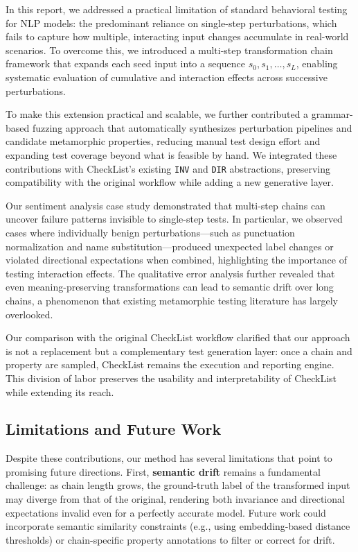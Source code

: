 \documentclass[11pt]{article}
\begin{document}
In this report, we addressed a practical limitation of standard behavioral testing for NLP models: the predominant reliance on single-step perturbations, which fails to capture how multiple, interacting input changes accumulate in real-world scenarios. To overcome this, we introduced a multi-step transformation chain framework that expands each seed input into a sequence $s_0, s_1, \dots, s_L$, enabling systematic evaluation of cumulative and interaction effects across successive perturbations.

To make this extension practical and scalable, we further contributed a grammar-based fuzzing approach that automatically synthesizes perturbation pipelines and candidate metamorphic properties, reducing manual test design effort and expanding test coverage beyond what is feasible by hand. We integrated these contributions with CheckList's existing \texttt{INV} and \texttt{DIR} abstractions, preserving compatibility with the original workflow while adding a new generative layer.

Our sentiment analysis case study demonstrated that multi-step chains can uncover failure patterns invisible to single-step tests. In particular, we observed cases where individually benign perturbations—such as punctuation normalization and name substitution—produced unexpected label changes or violated directional expectations when combined, highlighting the importance of testing interaction effects. The qualitative error analysis further revealed that even meaning-preserving transformations can lead to semantic drift over long chains, a phenomenon that existing metamorphic testing literature has largely overlooked.

Our comparison with the original CheckList workflow clarified that our approach is not a replacement but a complementary test generation layer: once a chain and property are sampled, CheckList remains the execution and reporting engine. This division of labor preserves the usability and interpretability of CheckList while extending its reach.

\subsection*{Limitations and Future Work}

Despite these contributions, our method has several limitations that point to promising future directions. First, \textbf{semantic drift} remains a fundamental challenge: as chain length grows, the ground-truth label of the transformed input may diverge from that of the original, rendering both invariance and directional expectations invalid even for a perfectly accurate model. Future work could incorporate semantic similarity constraints (e.g., using embedding-based distance thresholds) or chain-specific property annotations to filter or correct for drift.
\end{document}
